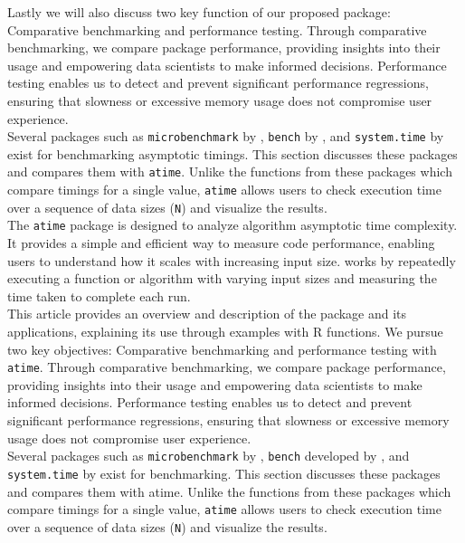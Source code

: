 \noindent Lastly we will also discuss two key function of our proposed package: Comparative benchmarking and performance testing. Through comparative benchmarking, we compare package performance, providing insights into their usage and empowering data scientists to make informed decisions. Performance testing enables us to detect and prevent significant performance regressions, ensuring that slowness or excessive memory usage does not compromise user experience.\\

\noindent Several packages such as \texttt{microbenchmark} by \cite{microbenchmark}, \texttt{bench} by \cite{bench}, and \texttt{system.time} by \cite{system.time} exist for benchmarking asymptotic timings. This section discusses these packages and compares them with \texttt{atime}. Unlike the functions from these packages which compare timings for a single value, \texttt{atime} allows users to check execution time over a sequence of data sizes (\texttt{N}) and visualize the results.
\\ 
 
\noindent The \texttt{atime} package is designed to analyze algorithm asymptotic time complexity. It provides a simple and efficient way to measure code performance, enabling users to understand how it scales with increasing input size.  works by repeatedly executing a function or algorithm with varying input sizes and measuring the time taken to complete each run. \\

\noindent This article provides an overview and description of the package and its applications, explaining its use through examples with R functions. We pursue two key objectives: Comparative benchmarking and performance testing with \texttt{atime}. Through comparative benchmarking, we compare package performance, providing insights into their usage and empowering data scientists to make informed decisions. Performance testing enables us to detect and prevent significant performance regressions, ensuring that slowness or excessive memory usage does not compromise user experience.\\


\noindent Several packages such as \texttt{microbenchmark} by \cite{microbenchmark}, \texttt{bench} developed by \cite{bench}, and \texttt{system.time} by \cite{system.time} exist for benchmarking. This section discusses these packages and compares them with atime. Unlike the functions from these packages which compare timings for a single value, \texttt{atime} allows users to check execution time over a sequence of data sizes (\texttt{N}) and visualize the results.\\ 

